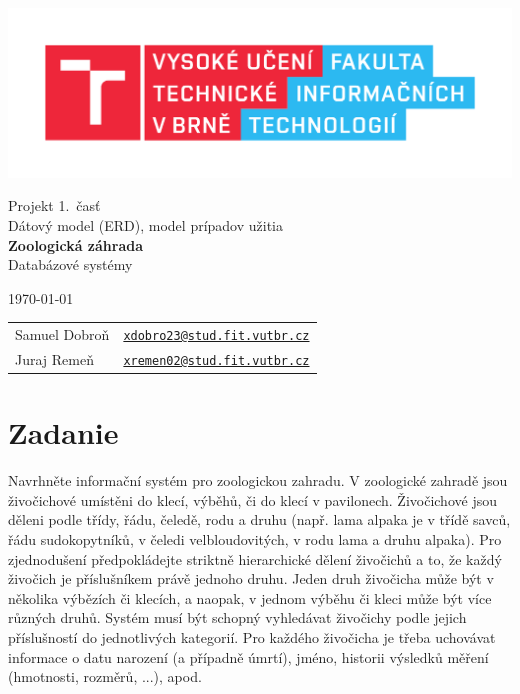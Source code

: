 \documentclass[11pt, a4paper]{article}
\begin{document}
	\begin{titlepage}
		\begin{center}
			\includegraphics[width=0.77 \linewidth]{FIT_logo.pdf} \\


			\Huge{Projekt 1.~časť} \\
			\Huge{Dátový model (ERD), model prípadov užitia} \\
			\LARGE{\textbf{Zoologická záhrada}} \\
			\Large{Databázové systémy}

		\end{center}

		{\Large
			\today
			\hfill
			\begin{tabular}{ll}
			Samuel Dobroň & \href{mailto:xdobro23@stud.fit.vutbr.cz}{\texttt{xdobro23@stud.fit.vutbr.cz}} \\
            Juraj Remeň & \href{mailto:xremen02@stud.fit.vutbr.cz}{\texttt{xremen02@stud.fit.vutbr.cz}}
\end{tabular}
}
	\end{titlepage}
		\tableofcontents
		\vspace{21em}
		\section{Zadanie}
		Navrhněte informační systém pro zoologickou zahradu. V zoologické zahradě jsou živočichové umístěni do klecí, výběhů, či do klecí v pavilonech. Živočichové jsou děleni podle třídy, řádu, čeledě, rodu a druhu (např. lama alpaka je v třídě savců, řádu sudokopytníků, v čeledi velbloudovitých, v rodu lama a druhu alpaka). Pro zjednodušení předpokládejte striktně hierarchické dělení živočichů a to, že každý živočich je příslušníkem právě jednoho druhu. Jeden druh živočicha může být v několika výbězích či klecích, a naopak, v jednom výběhu či kleci může být více různých druhů. Systém musí být schopný vyhledávat živočichy podle jejich příslušností do jednotlivých kategorií. Pro každého živočicha je třeba uchovávat informace o datu narození (a případně úmrtí), jméno, historii výsledků měření (hmotnosti, rozměrů, ...), apod.
\end{document}
